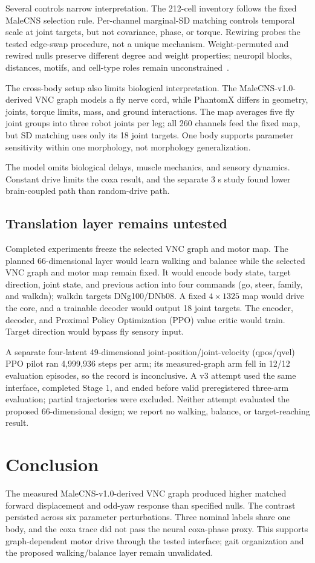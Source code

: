 \documentclass[conference]{IEEEtran}
\begin{document}
Several controls narrow interpretation. The 212-cell inventory follows the fixed MaleCNS selection rule. Per-channel marginal-SD matching controls temporal scale at joint targets, but not covariance, phase, or torque. Rewiring probes the tested edge-swap procedure, not a unique mechanism. Weight-permuted and rewired nulls preserve different degree and weight properties; neuropil blocks, distances, motifs, and cell-type roles remain unconstrained~\cite{lin2024network}.

The cross-body setup also limits biological interpretation. The MaleCNS-v1.0-derived VNC graph models a fly nerve cord, while PhantomX differs in geometry, joints, torque limits, mass, and ground interactions. The map averages five fly joint groups into three robot joints per leg; all 260 channels feed the fixed map, but SD matching uses only its 18 joint targets. One body supports parameter sensitivity within one morphology, not morphology generalization.

The model omits biological delays, muscle mechanics, and sensory dynamics. Constant drive limits the coxa result, and the separate 3 s study found lower brain-coupled path than random-drive path.

\subsection{Translation layer remains untested}
Completed experiments freeze the selected VNC graph and motor map. The planned
66-dimensional layer would learn walking and balance while the selected VNC graph
and motor map remain fixed. It
would encode body state, target direction, joint state, and previous action into
four commands (go, steer, family, and walkdn); walkdn targets DNg100/DNb08. A
fixed $4\times1325$ map would drive the core, and a trainable decoder would output
18 joint targets. The encoder, decoder, and Proximal Policy Optimization (PPO)
value critic would train. Target direction would bypass fly sensory input.

A separate four-latent 49-dimensional joint-position/joint-velocity (qpos/qvel)
PPO pilot ran 4,999,936 steps
per arm; its measured-graph arm fell in 12/12 evaluation episodes, so the record
is inconclusive. A v3 attempt used the same interface, completed Stage 1, and
ended before valid preregistered three-arm evaluation; partial trajectories were
excluded. Neither attempt evaluated the proposed 66-dimensional design; we report
no walking, balance, or target-reaching result.

\section{Conclusion}
\label{sec:conclusion}
The measured MaleCNS-v1.0-derived VNC graph produced higher matched forward displacement and odd-yaw response than specified nulls. The contrast persisted across six parameter perturbations. Three nominal labels share one body, and the coxa trace did not pass the neural coxa-phase proxy. This supports graph-dependent motor drive through the tested interface; gait organization and the proposed walking/balance layer remain unvalidated.



\end{document}
